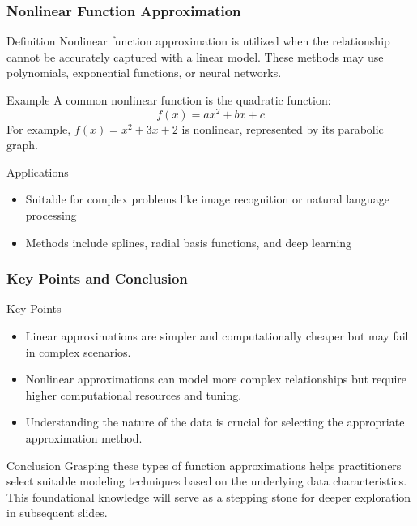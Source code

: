 \documentclass[aspectratio=169]{beamer}
\begin{document}
\begin{frame}[fragile]
    \frametitle{Nonlinear Function Approximation}
    \begin{block}{Definition}
        Nonlinear function approximation is utilized when the relationship cannot be accurately captured with a linear model.
        These methods may use polynomials, exponential functions, or neural networks.
    \end{block}
    
    \begin{block}{Example}
        A common nonlinear function is the quadratic function:
        \begin{equation}
            f(x) = ax^2 + bx + c
        \end{equation}
        For example, $f(x) = x^2 + 3x + 2$ is nonlinear, represented by its parabolic graph.
    \end{block}
    
    \begin{block}{Applications}
        \begin{itemize}
            \item Suitable for complex problems like image recognition or natural language processing
            \item Methods include splines, radial basis functions, and deep learning
        \end{itemize}
    \end{block}
\end{frame}

\begin{frame}[fragile]
    \frametitle{Key Points and Conclusion}
    \begin{block}{Key Points}
        \begin{itemize}
            \item Linear approximations are simpler and computationally cheaper but may fail in complex scenarios.
            \item Nonlinear approximations can model more complex relationships but require higher computational resources and tuning.
            \item Understanding the nature of the data is crucial for selecting the appropriate approximation method.
        \end{itemize}
    \end{block}

    \begin{block}{Conclusion}
        Grasping these types of function approximations helps practitioners select suitable modeling techniques based on the underlying data characteristics.
        This foundational knowledge will serve as a stepping stone for deeper exploration in subsequent slides.
    \end{block}
\end{frame}
\end{document}
